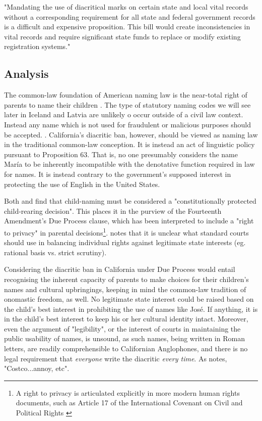 \begin{aquote}{\parencite{veto}}
	
	"Mandating the use of diacritical marks on certain state and local vital
	records without a corresponding requirement for all state and federal
	government records is a difficult and expensive proposition. This bill would
	create inconsistencies in vital records and require significant state funds
	to replace or modify existing registration systems."

\end{aquote}

\subsection{Analysis}

The common-law foundation of American naming law is the near-total right of
parents to name their children \parencite{heymann11}. The type of statutory
naming codes we will see later in Iceland and Latvia are unlikely o occur
outside of a civil law context. Instead any name which is not used for
fraudulent or malicious purposes should be accepted. \parencite{ferner}
\parencite{finch08} \parencite{heymann11}. California's diacritic ban, however,
should be viewed as naming law in the traditional common-law conception. It is
instead an act of linguistic policy pursuant to Proposition 63. That is, no one
presumably considers the name María to be inherently incompatible with the
denotative function required in law for names. It is instead contrary to the
government's supposed interest in protecting the use of English in the United
States.

Both \textcite{larson11} and \textcite[598]{foggan} find that child-naming must
be considered a "constitutionally protected child-rearing decision". This
places it in the purview of the Fourteenth Amendment's Due Process clause,
which has been interpreted to include a "right to privacy" in parental
decisions\footnote{A right to privacy is articulated explicitly in more modern
human rights documents, such as Article 17 of the International Covenant on
Civil and Political Rights \parencite{iccpr}}. \textcite{larson11} notes that
it is unclear what standard courts should use in balancing individual rights
against legitimate state interests (eg. rational basis vs. strict scrutiny).

Considering the diacritic ban in California under Due Process would entail
recognising the inherent capacity of parents to make choices for their
children's names and cultural upbringings, keeping in mind the common-law
tradition of onomastic freedom, as well. No legitimate state interest could be
raised based on the child's best interest in prohibiting the use of names like
José. If anything, it is in the child's best interest to keep his or her
cultural identity intact. Moreover, even the argument of "legibility", or the
interest of courts in maintaining the public usability of names, is unsound, as
such names, being written in Roman letters, are readily comprehensible to
Californian Anglophones, and there is no legal requirement that
\textit{everyone} write the diacritic \textit{every time}. As
\parencite{larson11} notes, "Costco...annoy, etc".

